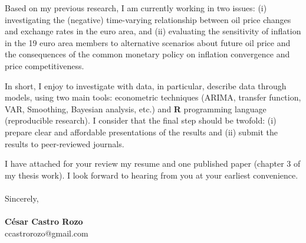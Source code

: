 \documentclass{letter}\usepackage[]{graphicx}\usepackage[]{color}
\begin{document}
{Based on my previous research, I am currently working in two issues: (i) investigating the (negative) time-varying relationship between oil price changes and exchange rates in the euro area, and (ii) evaluating the sensitivity of inflation in the 19 euro area members to alternative scenarios about future oil price and the consequences of the common monetary policy on inflation convergence and price competitiveness.

In short, I enjoy to investigate with data, in particular, describe data through models, using two main tools: econometric techniques (ARIMA, transfer function, VAR, Smoothing, Bayesian analysis, etc.) and \textbf{\textsf{R}} programming language (reproducible research). I consider that the final step should be twofold: (i) prepare clear and affordable presentations of the results and (ii) submit the results to peer-reviewed journals.

I have attached for your review my resume and one published paper (chapter 3 of my thesis work). I look forward to hearing from you at your earliest convenience.\\
\\
Sincerely,\\
\\
\textbf{César Castro Rozo}\\
ccastrorozo@gmail.com\\

% 
% 
% 

}
\end{document}
